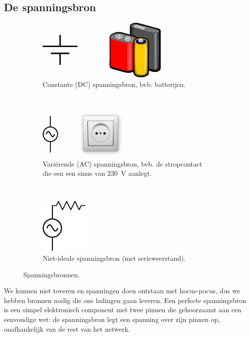 \documentclass{article}
\begin{document}
		\subsection{De spanningsbron}

			\begin{figure}[hbtp]
				\centering
				\begin{subfigure}[b]{0.25\linewidth}
					\centering
					\includegraphics[width=\linewidth]{vc}
					\caption{Constante (DC) spanningsbron, bvb. batterijen.}
				\end{subfigure}
				~
				\begin{subfigure}[b]{0.25\linewidth}
					\centering
					\includegraphics[width=\linewidth]{vt}
					\caption{Vari\"erende (AC) spanningsbron, bvb. de stropcontact die een een sinus van 230~V aanlegt.}
				\end{subfigure}
				~
				\begin{subfigure}[b]{0.25\linewidth}
					\centering
					\includegraphics{nivbron}
					\caption{Niet-ideale spanningsbron (met serieweerstand).}
					\label{subfig:niet_id_bron}
				\end{subfigure}

				\caption{Spanningsbronnen.}
				\label{fig:vbron}
			\end{figure}
			 We kunnen niet toveren en spanningen doen ontstaan met hocus-pocus, dus we hebben bronnen nodig die ons ladingen gaan leveren. Een perfecte spanningsbron is een simpel elektronisch component met twee pinnen die gehoorzaamt aan een eenvoudige wet: de spanningsbron legt een spanning over zijn pinnen op, onafhankelijk van de rest van het netwerk.
			 
\end{document}
